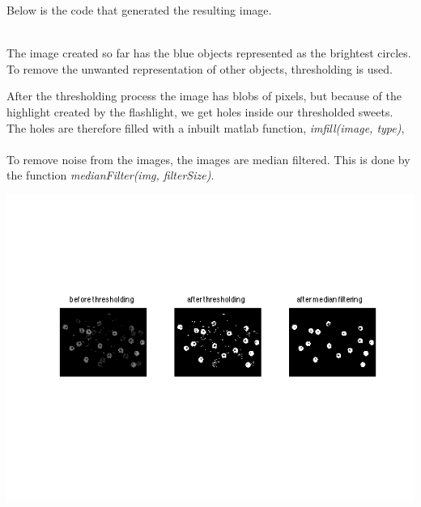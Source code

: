 \mbox{}
Below is the code that generated the resulting image. 

\mbox{}\\
The image created so far has the blue objects represented as the brightest circles. To remove the unwanted representation of other objects, thresholding is used.

After the thresholding process the image has blobs of pixels, but because of the highlight created by the flashlight, we get holes inside our thresholded sweets. The holes are therefore filled with a inbuilt matlab function, \emph{imfill(image, type)},
\\

\mbox{}\\
To remove noise from the images, the images are median filtered. This is done by the function \emph{medianFilter(img, filterSize)}. 
\\


\centerline{\includegraphics[clip=true, trim=40 100 40 80]{separate_step3_1.png}}

